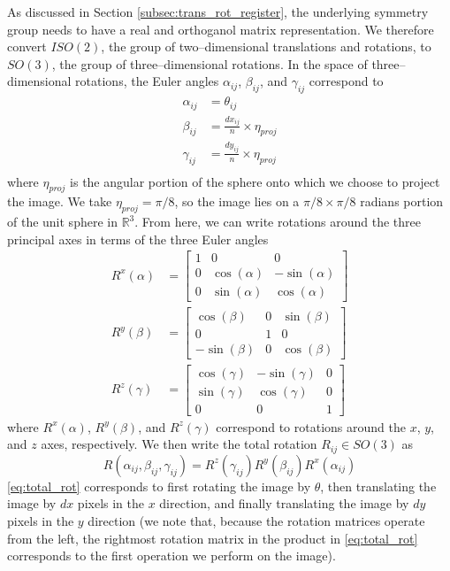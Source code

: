 \documentclass[11pt]{article}
\begin{document}
As discussed in Section \ref{subsec:trans_rot_register}, the underlying symmetry group needs to have a real and orthoganol matrix representation. 
%
We therefore convert $ISO(2)$, the group of two--dimensional translations and rotations, to $SO(3)$, the group of three--dimensional rotations. 
%
In the space of three--dimensional rotations, the Euler angles $\alpha_{ij}$, $\beta_{ij}$, and $\gamma_{ij}$ correspond to
\begin{equation} \label{eq:angle_relations}
\begin{aligned}
	\alpha_{ij} &= \theta_{ij} \\
	\beta_{ij} &= \frac{dx_{ij}}{n} \times \eta_{proj} \\
	\gamma_{ij} &= \frac{dy_{ij}}{n} \times \eta_{proj} \\
\end{aligned}
\end{equation}
where $\eta_{proj}$ is the angular portion of the sphere onto which we choose to project the image.
%
We take $\eta_{proj} =  \pi/8$, so the image lies on a $\pi/8 \times \pi/8$ radians portion of the unit sphere in $\mathbb{R}^3$.
%
From here, we can write rotations around the three principal axes in terms of the three Euler angles
\begin{equation}
\begin{aligned}
	R^x(\alpha) &= \begin{bmatrix}
	1 & 0 & 0 \\
    0 & \cos(\alpha) & -\sin(\alpha) \\
    0 & \sin(\alpha) & \cos(\alpha)
	\end{bmatrix} \\
	R^y(\beta) &= \begin{bmatrix}
	\cos(\beta) & 0 & \sin(\beta) \\
    0 & 1 & 0 \\
    -\sin(\beta) & 0 & \cos(\beta)
    \end{bmatrix} \\
	R^z(\gamma) &= \begin{bmatrix} 
	\cos(\gamma) & -\sin(\gamma) & 0 \\
    \sin(\gamma) & \cos(\gamma) & 0 \\
    0 & 0 & 1 
    \end{bmatrix}
\end{aligned}
\end{equation}
where $R^x(\alpha)$, $R^y(\beta)$, and $R^z(\gamma)$ correspond to rotations around the $x$, $y$, and $z$ axes, respectively.
%
We then write the total rotation $R_{ij} \in SO(3)$ as 
\begin{equation} \label{eq:total_rot}
	R(\alpha_{ij}, \beta_{ij}, \gamma_{ij})	 = R^z(\gamma_{ij})  R^y(\beta_{ij})  R^x(\alpha_{ij})
\end{equation}
%
\eqref{eq:total_rot} corresponds to first rotating the image by $\theta$, then translating the image by $dx$ pixels in the $x$ direction, and finally translating the image by $dy$ pixels in the $y$ direction (we note that, because the rotation matrices operate from the left, the rightmost rotation matrix in the product in \eqref{eq:total_rot} corresponds to the first operation we perform on the image).
\end{document}
